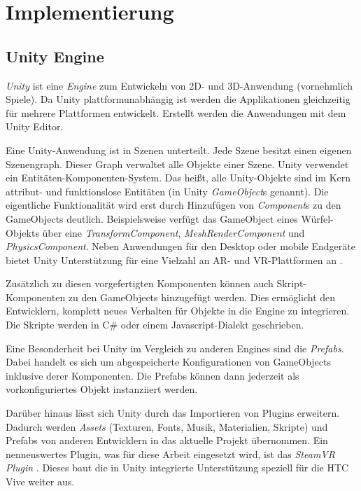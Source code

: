 \chapter{Implementierung}

\section{Unity Engine}
\emph{Unity} \autocite{UnityTechnologies2018} ist eine \emph{Engine} zum Entwickeln von 2D- und 3D-Anwendung (vornehmlich Spiele).
Da Unity plattformunabhängig ist werden die Applikationen gleichzeitig für mehrere Plattformen entwickelt.
Erstellt werden die Anwendungen mit dem Unity Editor.

Eine Unity-Anwendung ist in Szenen unterteilt.
Jede Szene besitzt einen eigenen Szenengraph.
Dieser Graph verwaltet alle Objekte einer Szene.
Unity verwendet ein Entitäten-Komponenten-System.
Das heißt, alle Unity-Objekte sind im Kern attribut- und funktionslose Entitäten (in Unity \emph{GameObject}s genannt).
Die eigentliche Funktionalität wird erst durch Hinzufügen von \emph{Component}s zu den GameObjects deutlich.
Beispielsweise verfügt das GameObject eines Würfel-Objekts über eine \emph{TransformComponent}, \emph{MeshRenderComponent} und \emph{PhysicsComponent}.
Neben Anwendungen für den Desktop oder mobile Endgeräte bietet Unity Unterstützung für eine Vielzahl an AR- und VR-Plattformen an \parencite{UnityTechnologies2018b}.

Zusätzlich zu diesen vorgefertigten Komponenten können auch Skript-Komponenten zu den GameObjects hinzugefügt werden.
Dies ermöglicht den Entwicklern, komplett neues Verhalten für Objekte in die Engine zu integrieren.
Die Skripte werden in C\# oder einem Javascript-Dialekt geschrieben.

Eine Besonderheit bei Unity im Vergleich zu anderen Engines sind die \emph{Prefabs}.
Dabei handelt es sich um abgespeicherte Konfigurationen von GameObjects inklusive derer Komponenten.
Die Prefabs können dann jederzeit als vorkonfiguriertes Objekt instanziiert werden.

Darüber hinaus lässt sich Unity durch das Importieren von Plugins erweitern.
Dadurch werden \emph{Assets} (Texturen, Fonts, Musik, Materialien, Skripte) und Prefabs von anderen Entwicklern in das aktuelle Projekt übernommen.
Ein nennenswertes Plugin, was für diese Arbeit eingesetzt wird, ist das \emph{SteamVR Plugin} \autocite{ValveCorporation2018}.
Dieses baut die in Unity integrierte Unterstützung speziell für die HTC Vive weiter aus.

